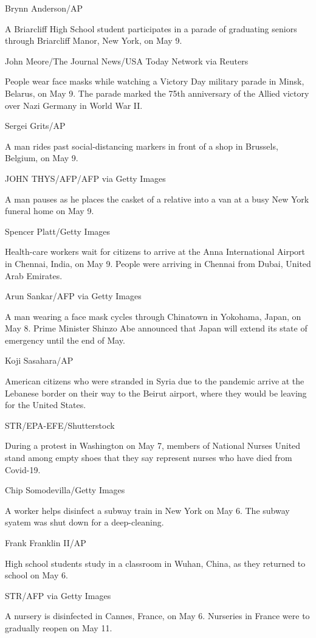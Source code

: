 Brynn Anderson/AP

A Briarcliff High School student participates in a parade of graduating
seniors through Briarcliff Manor, New York, on May 9.

John Meore/The Journal News/USA Today Network via Reuters

People wear face masks while watching a Victory Day military parade in
Minsk, Belarus, on May 9. The parade marked the 75th anniversary of the
Allied victory over Nazi Germany in World War II.

Sergei Grits/AP

A man rides past social-distancing markers in front of a shop in
Brussels, Belgium, on May 9.

JOHN THYS/AFP/AFP via Getty Images

A man pauses as he places the casket of a relative into a van at a busy
New York funeral home on May 9.

Spencer Platt/Getty Images

Health-care workers wait for citizens to arrive at the Anna
International Airport in Chennai, India, on May 9. People were arriving
in Chennai from Dubai, United Arab Emirates.

Arun Sankar/AFP via Getty Images

A man wearing a face mask cycles through Chinatown in Yokohama, Japan,
on May 8. Prime Minister Shinzo Abe announced that Japan will extend its
state of emergency until the end of May.

Koji Sasahara/AP

American citizens who were stranded in Syria due to the pandemic arrive
at the Lebanese border on their way to the Beirut airport, where they
would be leaving for the United States.

STR/EPA-EFE/Shutterstock

During a protest in Washington on May 7, members of National Nurses
United stand among empty shoes that they say represent nurses who have
died from Covid-19.

Chip Somodevilla/Getty Images

A worker helps disinfect a subway train in New York on May 6. The subway
syatem was shut down for a deep-cleaning.

Frank Franklin II/AP

High school students study in a classroom in Wuhan, China, as they
returned to school on May 6.

STR/AFP via Getty Images

A nursery is disinfected in Cannes, France, on May 6. Nurseries in
France were to gradually reopen on May 11.

